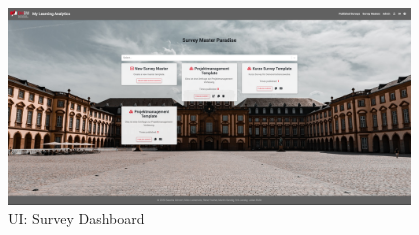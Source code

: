 \begin{figure}[!htb]
	\centering
	\includegraphics[width=0.95\textwidth, keepaspectratio]{img/client/SurveyMaster.png}
	\captionsetup{justification=centering, format=plain}
	\caption[\acf{UI}: Survey Dashboard]{\acf{UI}: Survey Dashboard \\ \quelleScreenshot}
	\label{fig:SurveyMasterDashboard}
\end{figure}